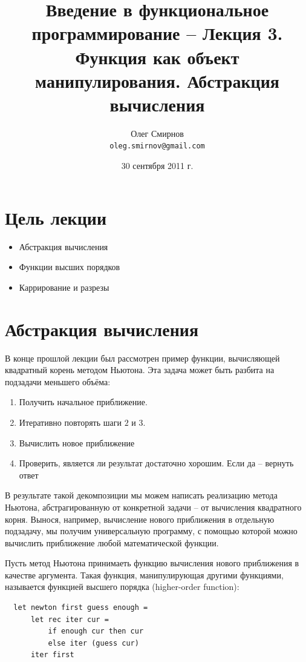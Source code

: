 \documentclass[a4paper,11pt]{article}
\author{Олег Смирнов\\
\texttt{oleg.smirnov@gmail.com}}
\date{30 сентября 2011 г.}
\title{Введение в функциональное программирование -- Лекция 3. Функция как 
объект манипулирования. Абстракция вычисления}
\begin{document}
\maketitle
\tableofcontents
\newpage

\section*{Цель лекции}
\begin{itemize}
\item Абстракция вычисления
\item Функции высших порядков
\item Каррирование и разрезы
\end{itemize}

\section{Абстракция вычисления}
В конце прошлой лекции был рассмотрен пример функции, вычисляющей квадратный
корень методом Ньютона. Эта задача может быть разбита на подзадачи меньшего
объёма:

\begin{enumerate}
\item Получить начальное приближение.
\item Итеративно повторять шаги $2$ и $3$.
\item Вычислить новое приближение
\item Проверить, является ли результат достаточно хорошим. Если да -- вернуть
ответ
\end{enumerate}

В результате такой декомпозиции мы можем написать реализацию метода Ньютона,
абстрагированную от конкретной задачи -- от вычисления квадратного корня.
Вынося, например, вычисление нового приближения в отдельную подзадачу, мы 
получим универсальную программу, с помощью которой можно вычислить приближение
любой математической функции.

Пусть метод Ньютона принимаеть функцию вычисления нового приближения в качестве
аргумента. Такая функция, манипулирующая другими функциями, называется функцией
высшего порядка (higher-order function):

\begin{lstlisting}
  let newton first guess enough =
      let rec iter cur = 
          if enough cur then cur
          else iter (guess cur)
      iter first
\end{lstlisting}
\end{document}
